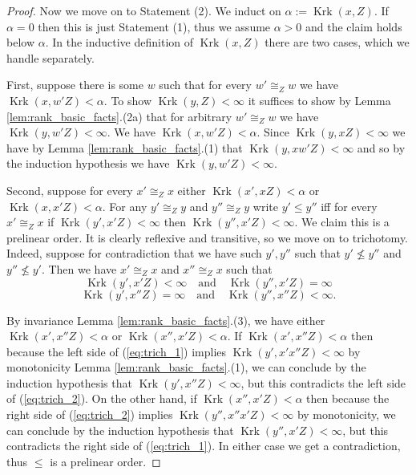 \documentclass[12pt]{amsart}
\theoremstyle{plain}
\theoremstyle{definition}
\newcommand{\isom}{\cong}
\DeclareMathOperator{\Krk}{Krk}
\begin{document}
\begin{proof}
Now we move on to Statement (2).
We induct on $\alpha := \Krk(x, Z)$.
If $\alpha = 0$ then this is just Statement (1), thus we assume $\alpha > 0$ and the claim holds below $\alpha$.
In the inductive definition of $\Krk(x, Z)$ there are two cases, which we handle separately.

First, suppose there is some $w$ such that for every $w' \isom_Z w$ we have $\Krk(x, w'Z) < \alpha$.
To show $\Krk(y, Z) < \infty$ it suffices to show by Lemma \ref{lem:rank_basic_facts}.(2a) that for arbitrary $w' \isom_Z w$ we have $\Krk(y, w'Z) < \infty$.
We have $\Krk(x, w'Z) < \alpha$.
Since $\Krk(y, xZ) < \infty$ we have by Lemma \ref{lem:rank_basic_facts}.(1) that $\Krk(y, xw'Z) < \infty$ and so by the induction hypothesis we have $\Krk(y, w'Z) < \infty$.

Second, suppose for every $x' \isom_Z x$ either $\Krk(x', xZ) < \alpha$ or $\Krk(x, x'Z) < \alpha$.
For any $y' \isom_Z y$ and $y'' \isom_Z y$ write $y' \le y''$ iff for every $x' \isom_Z x$ if $\Krk(y', x'Z) < \infty$ then $\Krk(y'', x'Z) < \infty$.
We claim this is a prelinear order.
It is clearly reflexive and transitive, so we move on to trichotomy.
Indeed, suppose for contradiction that we have such $y', y''$ such that $y' \not\le y''$ and $y'' \not\le y'$.
Then we have $x' \isom_Z x$ and $x'' \isom_Z x$ such that
\begin{equation}\label{eq:trich_1}
\Krk(y', x'Z) < \infty \quad \text{and} \quad \Krk(y'', x'Z) = \infty
\end{equation}
\begin{equation}\label{eq:trich_2}
\Krk(y', x''Z) = \infty \quad \text{and} \quad \Krk(y'', x''Z) < \infty.
\end{equation}

By invariance Lemma \ref{lem:rank_basic_facts}.(3), we have either $\Krk(x', x''Z) < \alpha$ or $\Krk(x'', x'Z) < \alpha$.
If $\Krk(x', x''Z) < \alpha$ then because the left side of (\ref{eq:trich_1}) implies $\Krk(y', x'x''Z) < \infty$ by monotonicity Lemma \ref{lem:rank_basic_facts}.(1), we can conclude by the induction hypothesis that $\Krk(y', x''Z) < \infty$, but this contradicts the left side of (\ref{eq:trich_2}).
On the other hand, if $\Krk(x'', x'Z) < \alpha$ then because the right side of (\ref{eq:trich_2}) implies $\Krk(y'', x''x'Z) < \infty$ by monotonicity, we can conclude by the induction hypothesis that $\Krk(y'', x'Z) < \infty$, but this contradicts the right side of (\ref{eq:trich_1}).
In either case we get a contradiction, thus $\le$ is a prelinear order.


\end{proof}
\end{document}
